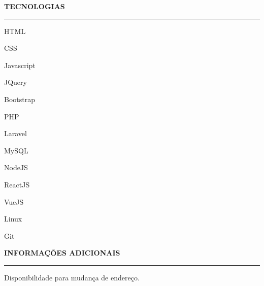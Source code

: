 \documentclass[a4paper,10pt]{article}
\begin{document}
\begin{flushleft}
\textbf{TECNOLOGIAS}
\noindent\textcolor{gray}{\rule{18cm}{1px}}
\end{flushleft}

\begin{itemize}
    \begin{item}
        HTML
    \end{item}
    \begin{item}
        CSS
    \end{item}
    \begin{item}
        Javascript
    \end{item}
    \begin{item}
        JQuery
    \end{item}
    \begin{item}
        Bootstrap
    \end{item}
    \begin{item}
        PHP
    \end{item}
    \begin{item}
        Laravel
    \end{item}
    \begin{item}
        MySQL
    \end{item}
    \begin{item}
        NodeJS
    \end{item}
    \begin{item}
        ReactJS
    \end{item}
    \begin{item}
        VueJS
    \end{item}
    \begin{item}
        Linux
    \end{item}
    \begin{item}
        Git
    \end{item}
    \newline
\end{itemize}

\begin{flushleft}
\textbf{INFORMA\c{C}\~{O}ES ADICIONAIS}
\noindent\textcolor{gray}{\rule{18cm}{1px}}
\end{flushleft}

\begin{itemize}
    \begin{item}
        Disponibilidade para mudan\c{c}a de endere\c{c}o.
    \end{item}
\end{itemize}
\end{document}
